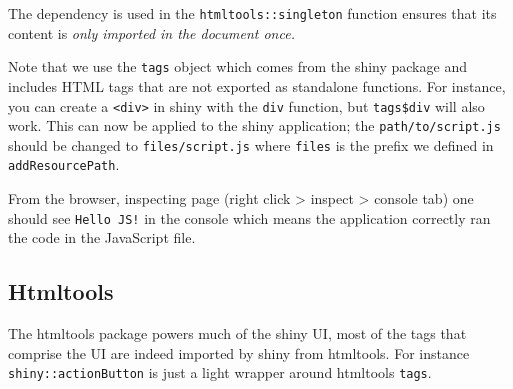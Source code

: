 \documentclass[10pt,]{krantz}
\makeatletter
\newenvironment{Shaded}{\begin{snugshade}}{\end{snugshade}}
\newcommand{\CommentTok}[1]{\textcolor[rgb]{0.37,0.37,0.37}{\textit{#1}}}
\newcommand{\ControlFlowTok}[1]{\textcolor[rgb]{0.27,0.27,0.27}{\textbf{#1}}}
\newcommand{\DataTypeTok}[1]{\textcolor[rgb]{0.27,0.27,0.27}{#1}}
\newcommand{\KeywordTok}[1]{\textcolor[rgb]{0.27,0.27,0.27}{\textbf{#1}}}
\newcommand{\NormalTok}[1]{#1}
\newcommand{\OperatorTok}[1]{\textcolor[rgb]{0.43,0.43,0.43}{\textbf{#1}}}
\newcommand{\StringTok}[1]{\textcolor[rgb]{0.5,0.5,0.5}{#1}}
\newenvironment{kframe}{%
\medskip{}
\setlength{\fboxsep}{.8em}
 \def\at@end@of@kframe{}%
 \ifinner\ifhmode%
  \def\at@end@of@kframe{\end{minipage}}%
  \begin{minipage}{\columnwidth}%
 \fi\fi%
 \def\FrameCommand##1{\hskip\@totalleftmargin \hskip-\fboxsep
 \colorbox{shadecolor}{##1}\hskip-\fboxsep
     \hskip-\linewidth \hskip-\@totalleftmargin \hskip\columnwidth}%
 \MakeFramed {\advance\hsize-\width
   \@totalleftmargin\z@ \linewidth\hsize
   \@setminipage}}%
 {\par\unskip\endMakeFramed%
 \at@end@of@kframe}
\renewenvironment{Shaded}{\begin{kframe}}{\end{kframe}}
\makeatother
\begin{document}
The dependency is used in the \texttt{htmltools::singleton} function ensures that its content is \emph{only imported in the document once.}

Note that we use the \texttt{tags} object which comes from the shiny package and includes HTML tags that are not exported as standalone functions. For instance, you can create a \texttt{\textless{}div\textgreater{}} in shiny with the \texttt{div} function, but \texttt{tags\$div} will also work. This can now be applied to the shiny application; the \texttt{path/to/script.js} should be changed to \texttt{files/script.js} where \texttt{files} is the prefix we defined in \texttt{addResourcePath}.

\begin{Shaded}
\end{Shaded}

From the browser, inspecting page (right click \textgreater{} inspect \textgreater{} console tab) one should see \texttt{Hello\ JS!} in the console which means the application correctly ran the code in the JavaScript file.

\hypertarget{basics-htmltools}{%
\subsection{Htmltools}\label{basics-htmltools}}

The htmltools package powers much of the shiny UI, most of the tags that comprise the UI are indeed imported by shiny from htmltools. For instance \texttt{shiny::actionButton} is just a light wrapper around htmltools \texttt{tags}.
\end{document}
